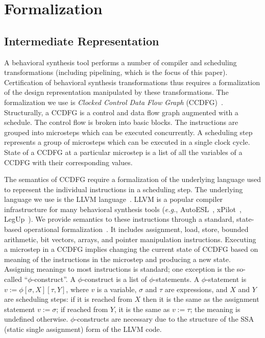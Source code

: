 \section{Formalization}
\label{sec:formalization}

\subsection{Intermediate Representation}
\label{subsec:ir}

A behavioral synthesis tool performs a number of compiler
and scheduling transformations (including pipelining, which is the focus of this paper). Certification of behavioral
synthesis transformations thus requires a formalization of
the design representation manipulated by these
transformations. The formalization we use is {\em Clocked
  Control Data Flow Graph} (CCDFG)~\cite{rhcxy:atva-09}. 
Structurally, a CCDFG is a control and data flow graph augmented with a schedule.
The control flow is broken into basic blocks. The instructions are grouped into microsteps which can be executed concurrently. A scheduling step represents a group of microsteps which can be executed in a single clock cycle. State of a CCDFG at a particular microstep is a list of all the variables of a CCDFG with their corresponding values. 

The semantics of CCDFG require a formalization of the
underlying language used to represent the individual
instructions in a scheduling step.  The underlying language we use
is the LLVM language~\cite{llvm}. LLVM is a popular compiler
infrastructure for many behavioral synthesis tools
({\em e.g.}, AutoESL~\cite{autoesl}, xPilot~\cite{xpilot},
LegUp~\cite{legup}).  We provide semantics to these
instructions through a standard, state-based operational
formalization~\cite{McCarthy}. It includes assignment,
load, store, bounded arithmetic, bit vectors, arrays, and
pointer manipulation instructions. Executing a microstep in
a CCDFG implies changing the current state of CCDFG based on
meaning of the instructions in the microstep and producing a
new state. Assigning meanings to most instructions is
standard; one exception is the so-called ``$\phi$-construct''. A $\phi$-construct is a list of $\phi$-statements. A $\phi$-statement is $v := \phi [\sigma, X] [\tau, Y]$, where $v$ is a variable, $\sigma$
and $\tau$ are expressions, and $X$ and $Y$ are
scheduling steps: if it is reached from $X$ then it is the
same as the assignment statement $v := \sigma$; if
reached from $Y$, it is the same as $v := \tau$; the meaning is undefined otherwise. $\phi$-constructs are necessary due to the structure of the SSA (static single
assignment) form of the LLVM code.


